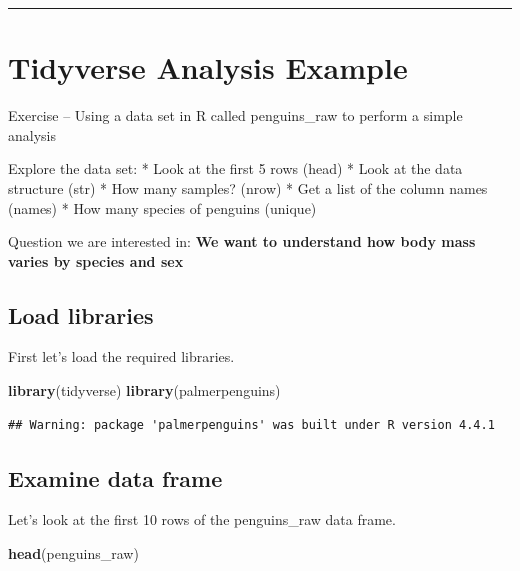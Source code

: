 \documentclass[
]{book}
\newenvironment{Shaded}{\begin{snugshade}}{\end{snugshade}}
\newcommand{\FunctionTok}[1]{\textcolor[rgb]{0.13,0.29,0.53}{\textbf{#1}}}
\newcommand{\NormalTok}[1]{#1}
\begin{document}
\begin{center}\rule{0.5\linewidth}{0.5pt}\end{center}

\section{Tidyverse Analysis Example}\label{tidyverse-analysis-example}

Exercise -- Using a data set in R called penguins\_raw to perform a simple analysis

Explore the data set:
* Look at the first 5 rows (head)
* Look at the data structure (str)
* How many samples? (nrow)
* Get a list of the column names (names)
* How many species of penguins (unique)

Question we are interested in: \textbf{We want to understand how body mass varies by species and sex}

\subsection{Load libraries}\label{load-libraries}

First let's load the required libraries.

\begin{Shaded}
\begin{Highlighting}[]
\FunctionTok{library}\NormalTok{(tidyverse)}
\FunctionTok{library}\NormalTok{(palmerpenguins)}
\end{Highlighting}
\end{Shaded}

\begin{verbatim}
## Warning: package 'palmerpenguins' was built under R version 4.4.1
\end{verbatim}

\subsection{Examine data frame}\label{examine-data-frame}

Let's look at the first 10 rows of the penguins\_raw data frame.

\begin{Shaded}
\begin{Highlighting}[]
\FunctionTok{head}\NormalTok{(penguins\_raw)}
\end{Highlighting}
\end{Shaded}
\end{document}
